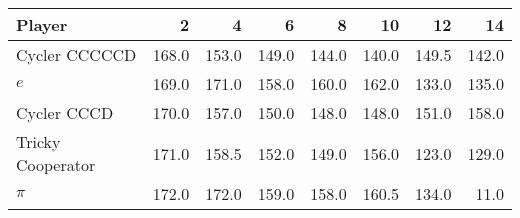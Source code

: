 \begin{tabular}{lrrrrrrr}
\toprule
            Player &      2 &      4 &      6 &      8 &     10 &     12 &     14 \\
\midrule
     Cycler CCCCCD &  168.0 &  153.0 &  149.0 &  144.0 &  140.0 &  149.5 &  142.0 \\
               $e$ &  169.0 &  171.0 &  158.0 &  160.0 &  162.0 &  133.0 &  135.0 \\
       Cycler CCCD &  170.0 &  157.0 &  150.0 &  148.0 &  148.0 &  151.0 &  158.0 \\
 Tricky Cooperator &  171.0 &  158.5 &  152.0 &  149.0 &  156.0 &  123.0 &  129.0 \\
             $\pi$ &  172.0 &  172.0 &  159.0 &  158.0 &  160.5 &  134.0 &   11.0 \\
\bottomrule
\end{tabular}
